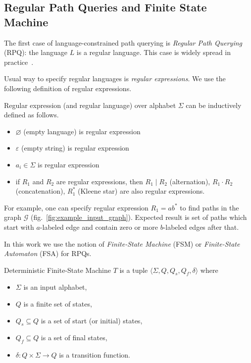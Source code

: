 \subsection{Regular Path Queries and Finite State Machine}

The first case of language-constrained path querying is \textit{Regular Path Querying} (RPQ): the language $L$ is a regular language. This case is widely spread in practice~\cite{!!!}. 

Usual way to specify regular languages is \textit{regular expressions}. 
We use the following definition of regular expressions.
\begin{definition}
Regular expression (and regular language) over alphabet $\Sigma$ can be inductively defined as follows.
\begin{itemize}
    \item $\varnothing$ (empty language) is regular expression
    \item $\varepsilon$ (empty string) is regular expression
    \item $a_i \in \Sigma$ is regular expression
    \item if $R_1$ and $R_2$ are regular expressions, then $R_1 \mid R_2$ (alternation), $R_1 \cdot R_2$ (concatenation), $R_1^*$ (Kleene star) are also regular expressions. 
\end{itemize}
\end{definition} 

For example, one can specify regular expression $R_1 = ab^*$ to find paths in the graph $\mathcal{G}$ (fig.~\ref{fig:example_input_graph}). Expected result is set of paths which start with $a$-labeled edge and contain zero or more $b$-labeled edges after that.

In this work we use the notion of \textit{Finite-State Machine} (FSM) or \textit{Finite-State Automaton} (FSA) for RPQs. 

\begin{definition}
Deterministic Finite-State Machine $T$ is a tuple $\langle \Sigma, Q, Q_s, Q_f, \delta \rangle$ where
\begin{itemize}
    \item $\Sigma$ is an input alphabet,
    \item $Q$ is a finite set of states,
    \item $Q_s \subseteq Q$ is a set of start (or initial) states,
    \item $Q_f \subseteq Q$ is a set of final states,
    \item $\delta: Q \times \Sigma \to Q$ is a transition function.
\end{itemize}
\end{definition}

